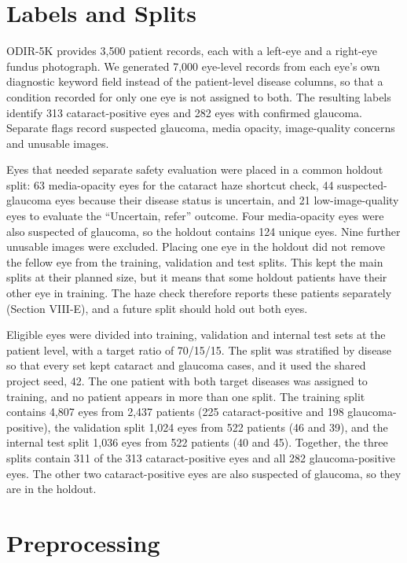 \documentclass[conference,a4paper]{IEEEtran}
\begin{document}
\section{Labels and Splits}

ODIR-5K provides 3,500 patient records, each with a left-eye and a right-eye fundus photograph. We
generated 7,000 eye-level records from each eye's own diagnostic keyword field instead of the
patient-level disease columns, so that a condition recorded for only one eye is not assigned to
both. The resulting labels identify 313 cataract-positive eyes and 282 eyes with confirmed glaucoma.
Separate flags record suspected glaucoma, media opacity, image-quality concerns and unusable images.

Eyes that needed separate safety evaluation were placed in a common holdout split: 63 media-opacity
eyes for the cataract haze shortcut check, 44 suspected-glaucoma eyes because their disease status
is uncertain, and 21 low-image-quality eyes to evaluate the ``Uncertain, refer'' outcome. Four
media-opacity eyes were also suspected of glaucoma, so the holdout contains 124 unique eyes. Nine
further unusable images were excluded. Placing one eye in the holdout did not remove the fellow eye
from the training, validation and test splits. This kept the main splits at their planned size, but
it means that some holdout patients have their other eye in training. The haze check therefore
reports these patients separately (Section VIII-E), and a future split should hold out both eyes.

Eligible eyes were divided into training, validation and internal test sets at the patient level,
with a target ratio of 70/15/15. The split was stratified by disease so that every set kept cataract
and glaucoma cases, and it used the shared project seed, 42. The one patient with both target
diseases was assigned to training, and no patient appears in more than one split. The training split
contains 4,807 eyes from 2,437 patients (225 cataract-positive and 198 glaucoma-positive), the
validation split 1,024 eyes from 522 patients (46 and 39), and the internal test split 1,036 eyes
from 522 patients (40 and 45). Together, the three splits contain 311 of the 313 cataract-positive
eyes and all 282 glaucoma-positive eyes. The other two cataract-positive eyes are also suspected of
glaucoma, so they are in the holdout.

\section{Preprocessing}
\end{document}
